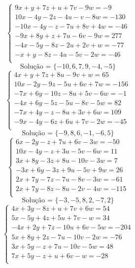 \documentclass[12pt,oneside,a4paper]{article}
\begin{document}
\vspace{\baselineskip}
\begin{equation*}
\begin{cases}
9x+y+7z+u+7v-9w=-9 \\
10x-4y-2z-4u-v-8w=-130 \\
-10x-4y-z-7u+8v+4w=-46 \\
-9x+8y+z+7u-6v-9w=277 \\
-4x-5y-8z-2u+2v+w=-77 \\
-x+y-8z-4u-5v-2w=-46 \\
\end{cases}
\end{equation*}
\begin{equation*}
\text{Solução = }\{-10,6,7,9,-4,-5\}
\end{equation*}
\vspace{\baselineskip}
\begin{equation*}
\begin{cases}
4x+y+7z+8u-9v+w=65 \\
10x-2y-9z-5u+6v+7w=-156 \\
-7x+6y-10z-8u+5v-6w=-1 \\
-4x+6y-5z-5u-8v-5w=82 \\
-7x+4y-z-8u+3v+6w=109 \\
-9x-4y-6z+6u+7v-2w=-45 \\
\end{cases}
\end{equation*}
\begin{equation*}
\text{Solução = }\{-9,8,6,-1,-6,5\}
\end{equation*}
\vspace{\baselineskip}
\begin{equation*}
\begin{cases}
6x-2y-z+7u+6v-3w=-50 \\
10x-4y-z+3u-5v-6w=11 \\
3x+8y-3z+8u-10v-3w=7 \\
-3x+6y-3z+9u-5v+9w=26 \\
2x+7y-7z-7u-8v-3w=-61 \\
2x+7y-8z-8u-2v-4w=-115 \\
\end{cases}
\end{equation*}
\begin{equation*}
\text{Solução = }\{-3,-5,8,2,-7,2\}
\end{equation*}
\vspace{\baselineskip}
\begin{equation*}
\begin{cases}
4x+3y-8z+u+7v+6w=54 \\
5x-5y+4z+5u+7v-w=34 \\
-4x+2y+7z-10u+6v-5w=-204 \\
5x+8y+2z-7u-10v-2w=-76 \\
3x+5y-z+7u-10v-5w=48 \\
7x+5y-z+u+6v-w=-28 \\
\end{cases}
\end{equation*}
\end{document}
